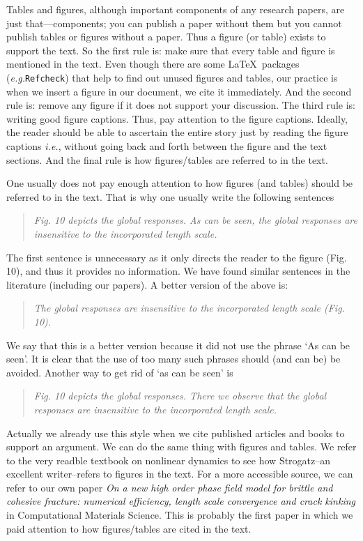 \documentclass[authoryear,12pta4paper,fleqn]{article}
\newcommand{\eg}{\textit{e.g.}\xspace}
\newcommand{\ie}{\textit{i.e.},\xspace}
\numberwithin{equation}{section}
\theoremstyle{remark}
\begin{document}
Tables and figures, although important components of any research papers, are just that—components; you can publish a paper without them but you cannot publish tables or figures without a paper. Thus a figure (or table) exists to support the text. So the first rule is: make sure that every table and figure is mentioned in the text. Even though there are some \LaTeX\ packages (\eg \texttt{Refcheck}) that help to find out unused figures and tables, our practice is when we insert a figure in our document, we cite it immediately. And the second rule is: remove any figure if it does not support your discussion. The third rule is: writing good figure captions. Thus, pay attention to the figure captions. Ideally, the reader should be able to ascertain the entire story just by reading the figure captions \ie without going back and forth between the figure and the text sections. And the final rule is how figures/tables are referred to in the text.

One usually does not pay enough attention to how figures (and tables) should be referred to in the text. That is why one usually write the following sentences

 \begin{quote}
  \textit{Fig. 10 depicts the global responses. As can be seen, the global responses are 
  insensitive to the incorporated length scale.}
 \end{quote}
The first sentence is unnecessary as it only directs the reader to the figure (Fig. 10), and thus it provides no information. We have found similar sentences in the literature (including our papers). A better version of the above is:

 \begin{quote}
  \textit{The global responses are insensitive to the incorporated length scale (Fig. 10).}
 \end{quote}
We say that this is a better version because it did not use the phrase `As can be seen'. It is clear that the use of too many such phrases should (and can be) be avoided. Another way to get rid of `as can be seen' is

 \begin{quote}
  \textit{Fig. 10 depicts the global responses. There we observe that the global responses are 
  insensitive to the incorporated length scale.}
 \end{quote}
Actually we already use this style when we cite published articles and books to support an argument. We can do the same thing with figures and tables. We refer to the very readble textbook on nonlinear dynamics \citep{strogatz2018nonlinear} to see how Strogatz--an excellent writer--refers to figures in the text. For a more accessible source, we can refer to our own paper \textit{On a new high order phase field model for brittle and cohesive fracture: numerical efficiency, length scale convergence and crack kinking} in Computational Materials Science. This is probably the first paper in which we paid attention to how figures/tables are cited in the text.
\end{document}
